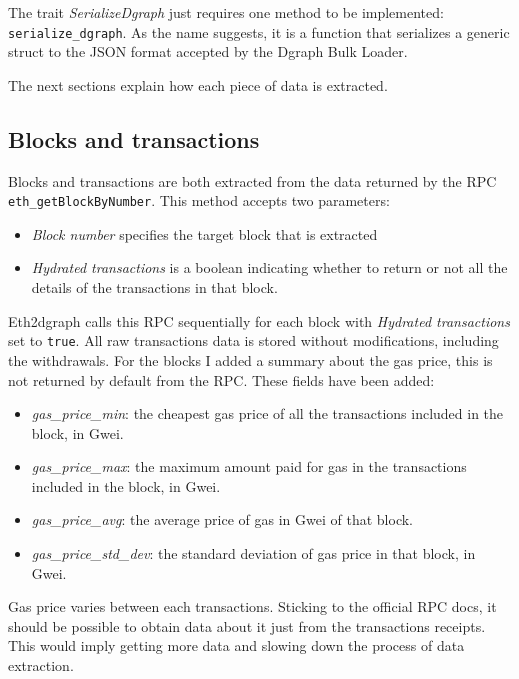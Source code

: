 The trait \textit{SerializeDgraph} just requires one method to be implemented:\\ \texttt{serialize\_dgraph}. As the name suggests, it is a function that serializes a generic struct to the JSON format accepted by the Dgraph Bulk Loader.

The next sections explain how each piece of data is extracted.

\subsection{Blocks and transactions}

Blocks and transactions are both extracted from the data returned by the RPC \texttt{eth\_getBlockByNumber}. 
This method accepts two parameters:

\begin{itemize}
    \item \textit{Block number} specifies the target block that is extracted
    \item \textit{Hydrated transactions} is a boolean indicating whether to return or not all the details of the transactions in that block.
\end{itemize}

Eth2dgraph calls this RPC sequentially for each block with \textit{Hydrated transactions} set to \texttt{true}. All raw transactions data is stored without modifications, including the withdrawals. For the blocks I added a summary about the gas price, this is not returned by  default from the RPC. These fields have been added: 

\begin{itemize}
    \item \textit{gas\_price\_min}: the cheapest gas price of all the transactions included in the block, in Gwei.
    \item \textit{gas\_price\_max}: the maximum amount paid for gas in the transactions included in the block, in Gwei.
    \item \textit{gas\_price\_avg}: the average price of gas in Gwei of that block.
    \item \textit{gas\_price\_std\_dev}: the standard deviation of gas price in that block, in Gwei.
\end{itemize}

Gas price varies between each transactions. Sticking to the official RPC docs, it should be possible to obtain data about it just from the transactions receipts. This would imply getting more data and slowing down the process of data extraction.

